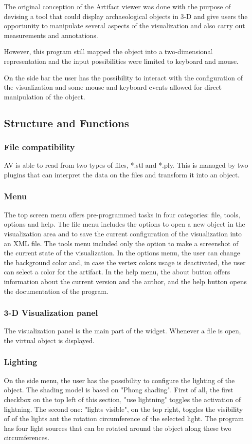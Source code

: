 \documentclass[12pt]{extarticle}
\begin{document}
The original conception of the Artifact viewer was done with the purpose of devising a tool that could display archaeological objects in 3-D and give users the opportunity to manipulate several aspects of the visualization and also carry out measurements and annotations.

However, this program still mapped the object into a two-dimensional representation and the input possibilities were limited to keyboard and mouse.

On the side bar the user has the possibility to interact with the configuration of the visualization and some mouse and keyboard events allowed for direct manipulation of the object.
\subsection {Structure and Functions}
	\subsubsection { File compatibility}
	AV is able to read from two types of files, *.stl and *.ply. This is managed by two plugins that can interpret the data on the files and transform it into an object.
	\subsubsection { Menu}
	The top screen menu offers pre-programmed tasks in four categories: file, tools, options and help.
	The file menu includes the options to open a new object in the visualization area and to save the current configuration of the visualization into an XML file.
	The tools menu included only the option to make a screenshot of the current state of the visualization.
	In the options menu, the user can change the background color and, in case the vertex colors usage is deactivated, the user can select a  color for the artifact.
	In the help menu, the about button offers information about the current version and the author, and the help button opens the documentation of the program.
	\subsubsection { 3-D Visualization panel}
	The visualization panel is the main part of the widget. Whenever a file is open, the virtual object is displayed.
	\subsubsection { Lighting}
	On the side menu, the user has the possibility to configure the lighting of the object. The shading model is based on "Phong shading". First of all, the first checkbox on the top left of this section, "use lightning" toggles the activation of lightning. The second one: "lights visible", on the top right, toggles the visibility of  of the lights ant the rotation circumference of the selected light. The program has four light sources that can be rotated around the object along these two circumferences. 
	
\end{document}
